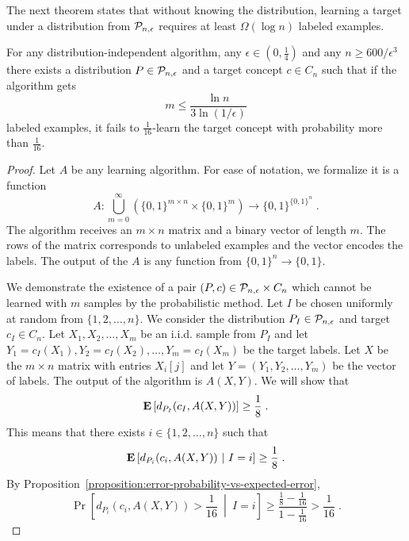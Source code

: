 The next theorem states that without knowing the distribution,
learning a target under a distribution from $\P_{n,\epsilon}$
requires at least $\Omega(\log n)$ labeled examples.

\begin{theorem}
For any distribution-independent algorithm, any $\epsilon \in (0,\frac{1}{4})$ and any
$n \ge 600/\epsilon^3$ there exists a distribution $P \in \P_{n,\epsilon}$ and a target
concept $c \in C_n$ such that if the algorithm gets
$$
m \le \frac{\ln n}{3 \ln (1/\epsilon)}
$$
labeled examples, it fails to $\frac{1}{16}$-learn the target concept with probability
more than $\frac{1}{16}$.
\end{theorem}

\begin{proof}
Let $A$ be any learning algorithm. For ease of notation, we formalize it is a function
$$
A:\bigcup_{m=0}^\infty \left(\{0,1\}^{m \times n} \times \{0,1\}^m\right) \to \{0,1\}^{\{0,1\}^n} \; .
$$
The algorithm receives an $m \times n$ matrix and a binary vector of length $m$.
The rows of the matrix corresponds to unlabeled examples and the vector encodes
the labels. The output of the $A$ is any function from $\{0,1\}^n \to \{0,1\}$.

We demonstrate the existence of a pair $(P,c) \in \P_{n,\epsilon} \times C_n$ which
cannot be learned with $m$ samples by the probabilistic method. Let $I$ be chosen
uniformly at random from $\{1,2,\dots,n\}$. We consider the distribution $P_I \in
\P_{n,\epsilon}$ and target $c_I \in C_n$. Let $X_1, X_2, \dots, X_m$ be an i.i.d.
sample from $P_I$ and let $Y_1 = c_I(X_1), Y_2 = c_I(X_2), \dots, Y_m =
c_I(X_m)$ be the target labels. Let $X$ be the $m \times n$ matrix with entries
$X_i[j]$ and let $Y = (Y_1, Y_2, \dots, Y_m)$ be the vector of labels. The
output of the algorithm is $A(X,Y)$. We will show that
\begin{equation}
\label{equation:projections-failure-probability}
\Exp \left[d_{P_I}(c_I, A(X,Y)) \right] \ge \frac{1}{8} \; .
\end{equation}
This means that there exists $i \in \{1,2,\dots,n\}$ such that
$$
\Exp \left[d_{P_i}(c_i, A(X,Y)) ~\middle|~ I = i \right] \ge \frac{1}{8} \; .
$$
By Proposition~\ref{proposition:error-probability-vs-expected-error},
$$
\Pr \left[ d_{P_i}(c_i, A(X,Y)) > \frac{1}{16} ~\middle|~ I = i \right] \ge \frac{\frac{1}{8} - \frac{1}{16}}{1 - \frac{1}{16}} > \frac{1}{16} \; .
$$


\end{proof}
